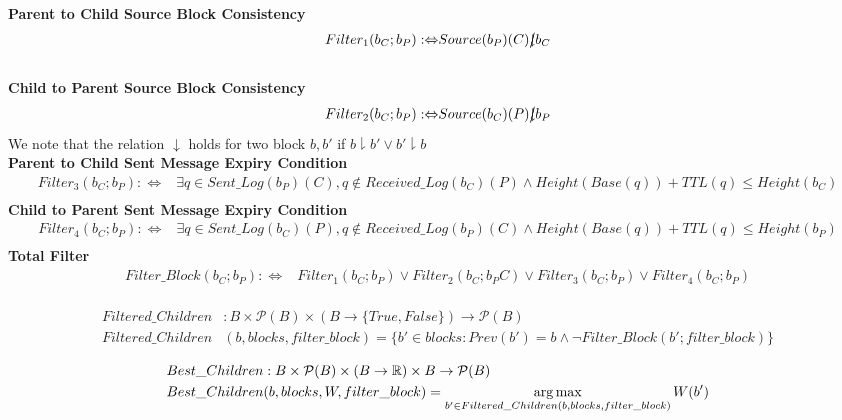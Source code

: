 \begin{defn}
  \textbf{\\Parent to Child Source Block Consistency}
  \begin{align*}
    Filter_1(b_C; b_P): \Leftrightarrow& Source(b_P)(C) \cancel{\downharpoonright} b_C \\
  \end{align*}
  \textbf{\\Child to Parent Source Block Consistency}
  \begin{align*}
    Filter_2(b_C; b_P): \Leftrightarrow& Source(b_C)(P) \cancel{\downharpoonright} b_P \\
  \end{align*}
  We note that the relation $\downarrow$ holds for two block $b, b'$ if $b \downharpoonright b' \lor b' \downharpoonright b$
  \textbf{\\Parent to Child Sent Message Expiry Condition}
  \begin{align*}
    Filter_3(b_C; b_P): \Leftrightarrow& \exists q \in Sent\_Log(b_P)(C), q \notin Received\_Log(b_C)(P) \land Height(Base(q)) + TTL(q) \leq Height(b_C) \\
  \end{align*}
  \textbf{Child to Parent Sent Message Expiry Condition}
  \begin{align*}
    Filter_4(b_C; b_P): \Leftrightarrow& \exists q \in Sent\_Log(b_C)(P), q \notin Received\_Log(b_P)(C) \land Height(Base(q)) + TTL(q) \leq Height(b_P) \\
  \end{align*}
  \textbf{Total Filter}
  \begin{align*}
    Filter\_Block(b_C; b_P): \Leftrightarrow& Filter_1(b_C; b_P) \lor Filter_2(b_C; b_PC) \lor Filter_3(b_C; b_P) \lor Filter_4(b_C; b_P) \\
  \end{align*}
\end{defn}


\begin{defn}
\begin{align*}
  Filtered\_Children&: B \times \mathcal{P}(B) \times ( B \to \{True, False\} ) \to \mathcal{P}(B) \\
  Filtered\_Children&(b, blocks, filter\_block) = \{ b' \in blocks: Prev(b') = b \land \neg Filter\_Block(b'; filter\_block) \}
\end{align*}
\end{defn}

\begin{defn}
\begin{align*}
  Best\_Children&: B \times \mathcal{P}(B) \times (B \to \mathbb{R}) \times B \to \mathcal{P}(B) \\
  Best\_Children&(b, blocks, W, filter\_block) =  \operatorname*{arg\,max}\limits_{b' \in Filtered\_Children(b, blocks, filter\_block)} W(b')
\end{align*}
\end{defn}

